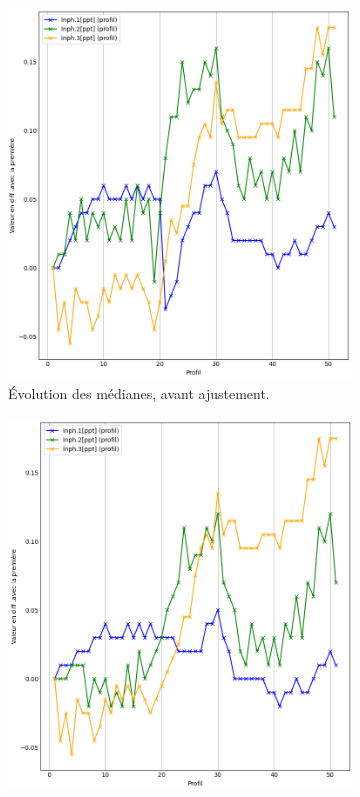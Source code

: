 \documentclass[12pt]{article}
\begin{document}
    \begin{figure}[ht!]
        \centering
        \begin{subfigure}[b]{0.475\textwidth}
            \centering
            \includegraphics[width=\textwidth]{Images/Base_man_Avant_sq1.png}
            \caption[]%
            {{ \small Évolution des médianes, avant ajustement.}}
            \label{fig:2_evol_base_man_a}
        \end{subfigure}
        \hfill
        \begin{subfigure}[b]{0.475\textwidth}  
            \centering 
            \includegraphics[width=\textwidth]{Images/Base_man_Apres_sq1.png}

\end{subfigure}
\end{figure}
\end{document}
